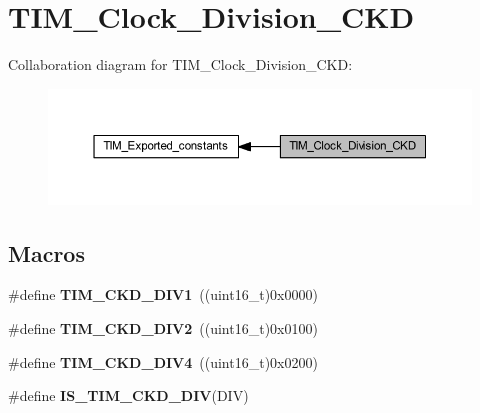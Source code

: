 \hypertarget{group___t_i_m___clock___division___c_k_d}{}\section{T\+I\+M\+\_\+\+Clock\+\_\+\+Division\+\_\+\+C\+KD}
\label{group___t_i_m___clock___division___c_k_d}
Collaboration diagram for T\+I\+M\+\_\+\+Clock\+\_\+\+Division\+\_\+\+C\+KD\+:\nopagebreak
\begin{figure}[H]
\begin{center}
\leavevmode
\includegraphics[width=350pt]{group___t_i_m___clock___division___c_k_d}
\end{center}
\end{figure}
\subsection*{Macros}
\begin{DoxyCompactItemize}
\item 
\mbox{\label{group___t_i_m___clock___division___c_k_d_ga88691a07b3976791977d280045b3c850}} 
\#define {\bfseries T\+I\+M\+\_\+\+C\+K\+D\+\_\+\+D\+I\+V1}~((uint16\+\_\+t)0x0000)
\item 
\mbox{\label{group___t_i_m___clock___division___c_k_d_ga46a5fd6a173a7e88528a6e4084a08665}} 
\#define {\bfseries T\+I\+M\+\_\+\+C\+K\+D\+\_\+\+D\+I\+V2}~((uint16\+\_\+t)0x0100)
\item 
\mbox{\label{group___t_i_m___clock___division___c_k_d_gac2e5c030f964f9b4c92fa8129fb923bc}} 
\#define {\bfseries T\+I\+M\+\_\+\+C\+K\+D\+\_\+\+D\+I\+V4}~((uint16\+\_\+t)0x0200)
\item 
\#define {\bfseries I\+S\+\_\+\+T\+I\+M\+\_\+\+C\+K\+D\+\_\+\+D\+IV}(D\+IV)
\end{DoxyCompactItemize}


